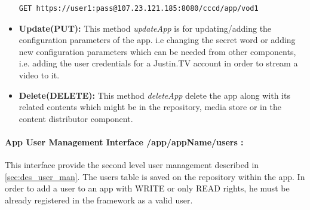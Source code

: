 \begin{itemize}
\begin{code}
\begin{verbatim}
GET https://user1:pass@107.23.121.185:8080/cccd/app/vod1
\end{verbatim}
\end{code}

\item \textbf{Update(PUT):}  This method \textit{updateApp} is for updating/adding the configuration parameters of the app. i.e changing the secret word or adding new configuration parameters which can be needed from other components, i.e. adding the user credentials for a Justin.TV account in order to stream a video to it.

\item \textbf{Delete(DELETE):} This method \textit{deleteApp} delete the app along with its related contents which might be in the repository, media store or in the content distributor component.

\end{itemize}

\paragraph{App User Management Interface /app/{appName}/users :} This interface provide the second level user management described in \ref{sec:des_user_man}. The users table is saved on the repository within the app. In order to add a user to an app with WRITE or only READ rights, he must be already registered in the framework as a valid user.


